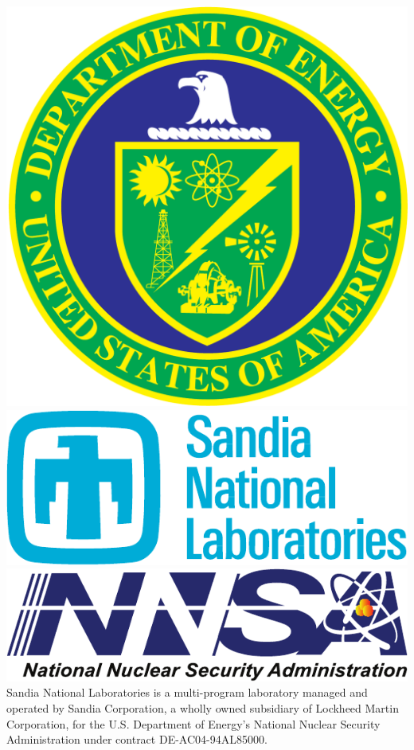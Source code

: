 \documentclass{sig-alt-gov2}
\begin{document}
\includegraphics[scale=0.07]{logos/doe_logo}
\includegraphics[scale=0.30]{logos/snl_logo}
\includegraphics[scale=0.35]{logos/nnsa_logo}
Sandia National Laboratories is a multi-program laboratory managed and operated
by Sandia Corporation, a wholly owned subsidiary of Lockheed Martin
Corporation, for the U.S. Department of Energy's National Nuclear Security
Administration under contract DE-AC04-94AL85000.




\vfill\eject
\end{document}
